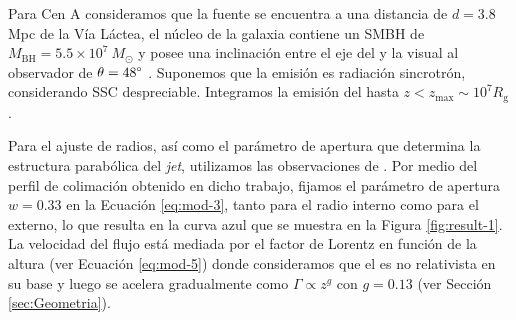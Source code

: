 	Para Cen A consideramos que la fuente se encuentra a una distancia de $d=3.8$ Mpc \citep{Harris2010} de la Vía Láctea, el núcleo de la galaxia contiene un SMBH de $M_\mathrm{BH} = 5.5\times10^7~M_\odot$ \citep{Neumayer2010} y posee una inclinaci\'on entre el eje del \jet y la visual al observador de $\theta=48\degree$ \citep{Mueller2011}.
	Suponemos que la emisión es radiación sincrotrón, considerando SSC despreciable.
	Integramos la emisión del \jet hasta $z < z_\mathrm{max} \sim 10^7 R_\mathrm{g}$.


	Para el ajuste de radios, así como el parámetro de apertura que determina la estructura parabólica del \textit{jet}, utilizamos las observaciones de \cite{2021NatAs...5.1017J}.
	Por medio del perfil de colimación obtenido en dicho trabajo, fijamos el parámetro de apertura $w=0.33$ en la Ecuación \eqref{eq:mod-3}, tanto para el radio interno como para el externo, lo que resulta en la curva azul que se muestra en la Figura \ref{fig:result-1}.
	La velocidad del flujo está mediada por el factor de Lorentz en función de la altura (ver Ecuación \eqref{eq:mod-5}) donde consideramos que el \jet es no relativista en su base y luego se acelera gradualmente como $\Gamma \propto z^g$ con $g=0.13$ (ver Sección \ref{sec:Geometria}).


